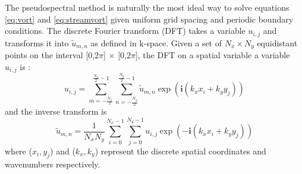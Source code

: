 \documentclass[conf]{new-aiaa}
\begin{document}
The pseudospectral method is naturally the most ideal way to solve equations \eqref{eq:vort} and \eqref{eq:streamvort} given uniform grid spacing and periodic boundary conditions. The discrete Fourier transform (DFT) takes a variable $u_{i,j}$ and transforms it into $\tilde{u}_{m,n}$ as defined in k-space. Given a set of $N_{x}\times N_{y}$ equidistant points on the interval [0,$2\pi$] $\times$ [0,$2\pi$], the DFT on a spatial variable a variable $u_{i,j}$ is \cite{DNS_Primer,Python_spectral}:
\begin{equation}
    \label{FFT}
    u_{i,j} = \sum_{m = -\frac{N_{x}}{2}}^{\frac{N_{x}}{2}-1}\sum_{n = -\frac{N_{y}}{2}}^{\frac{N_{y}}{2}-1} \tilde{u}_{m,n}\exp (\mathbf{i}(k_{x}x_{i}+k_{y}y_{j}))
\end{equation}
and the inverse transform is
\begin{equation}
    \label{inverseFFT}
    \tilde{u}_{m,n} = \frac{1}{N_{x}N_{y}}\sum_{i=0}^{N_{x}-1}\sum_{j=0}^{N_{y}-1} u_{i,j}\exp (-\mathbf{i}(k_{x}x_{i}+k_{y}y_{j}))
\end{equation}
where ($x_{i},y_{j}$) and ($k_{x},k_{y}$) represent the discrete spatial coordinates and wavenumbers respectively.
\end{document}
